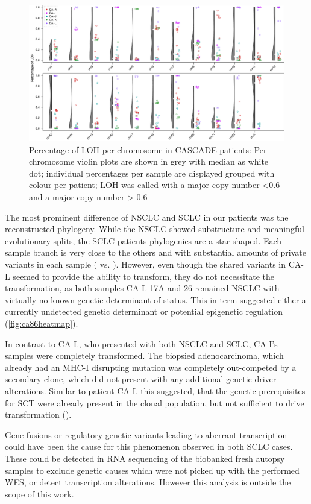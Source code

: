 \begin{figure}[ht]
\centering
\includegraphics[width=.99\linewidth]{Figures/CASCADE/LOH_perChrom.pdf}
\caption[Percentage of LOH per chromosome in CASCADE patients]{Percentage of LOH per chromosome in CASCADE patients: Per chromosome violin plots are shown in grey with median as white dot; individual percentages per sample are displayed grouped with colour per patient; LOH was called with a major copy number <0.6 and a major copy number > 0.6} \label{fig:cascadeLOH}
\end{figure}


The most prominent difference of NSCLC and SCLC in our patients was the reconstructed phylogeny. While the NSCLC showed substructure and meaningful evolutionary splits, the SCLC patients phylogenies are a star shaped. Each sample branch is very close to the others and with substantial amounts of private variants in each sample ( vs. ). However, even though the shared variants in CA-L seemed to provide the ability to transform, they do not necessitate the transformation, as both samples CA-L 17A and 26 remained NSCLC with virtually no known genetic determinant of status. This in term suggested either a currently undetected genetic determinant or potential epigenetic regulation (\autoref{fig:ca86heatmap}).

In contrast to CA-L, who presented with both NSCLC and SCLC, CA-I's samples were completely transformed. The biopsied adenocarcinoma, which already had an MHC-I disrupting mutation was completely out-competed by a secondary clone, which did not present with any additional genetic driver alterations. Similar to patient CA-L this suggested, that the genetic prerequisites for SCT were already present in the clonal population, but not sufficient to drive transformation (). 

Gene fusions or regulatory genetic variants leading to aberrant transcription could have been the cause for this phenomenon observed in both SCLC cases. These could be detected in RNA sequencing of the biobanked fresh autopsy samples to exclude genetic causes which were not picked up with the performed WES, or detect transcription alterations. However this analysis is outside the scope of this work.


